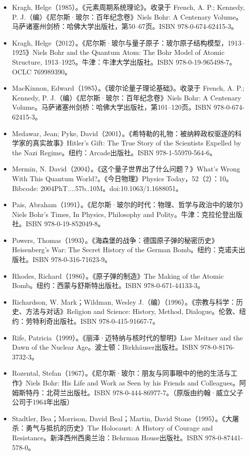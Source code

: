 \begin{itemize}
\item Kragh, Helge（1985）。《元素周期系统理论》。收录于 French, A. P.; Kennedy, P. J.（编）《尼尔斯·玻尔：百年纪念卷》Niels Bohr: A Centenary Volume。马萨诸塞州剑桥：哈佛大学出版社，第50–67页。ISBN 978-0-674-62415-3。
\item Kragh, Helge（2012）。《尼尔斯·玻尔与量子原子：玻尔原子结构模型，1913–1925》Niels Bohr and the Quantum Atom: The Bohr Model of Atomic Structure, 1913–1925。牛津：牛津大学出版社。ISBN 978-0-19-965498-7。OCLC 769989390。
\item MacKinnon, Edward（1985）。《玻尔论量子理论基础》。收录于 French, A. P.; Kennedy, P. J.（编）《尼尔斯·玻尔：百年纪念卷》Niels Bohr: A Centenary Volume。马萨诸塞州剑桥：哈佛大学出版社，第101–120页。ISBN 978-0-674-62415-3。
\item Medawar, Jean; Pyke, David（2001）。《希特勒的礼物：被纳粹政权驱逐的科学家的真实故事》Hitler's Gift: The True Story of the Scientists Expelled by the Nazi Regime。纽约：Arcade出版社。ISBN 978-1-55970-564-6。
\item Mermin, N. David（2004）。《这个量子世界出了什么问题？》What's Wrong With This Quantum World?。《今日物理》Physics Today，52（2）：10。Bibcode: 2004PhT....57b..10M。doi:10.1063/1.1688051。
\item Pais, Abraham（1991）。《尼尔斯·玻尔的时代：物理、哲学与政治中的玻尔》Niels Bohr's Times, In Physics, Philosophy and Polity。牛津：克拉伦登出版社。ISBN 978-0-19-852049-8。
\item Powers, Thomas（1993）。《海森堡的战争：德国原子弹的秘密历史》Heisenberg's War: The Secret History of the German Bomb。纽约：克诺夫出版社。ISBN 978-0-316-71623-9。
\item Rhodes, Richard（1986）。《原子弹的制造》The Making of the Atomic Bomb。纽约：西蒙与舒斯特出版社。ISBN 978-0-671-44133-3。
\item Richardson, W. Mark；Wildman, Wesley J.（编）（1996）。《宗教与科学：历史、方法与对话》Religion and Science: History, Method, Dialogue。伦敦、纽约：劳特利奇出版社。ISBN 978-0-415-91667-7。
\item Rife, Patricia（1999）。《丽泽·迈特纳与核时代的黎明》Lise Meitner and the Dawn of the Nuclear Age。波士顿：Birkhäuser出版社。ISBN 978-0-8176-3732-3。
\item Rozental, Stefan（1967）。《尼尔斯·玻尔：朋友与同事眼中的他的生活与工作》Niels Bohr: His Life and Work as Seen by his Friends and Colleagues。阿姆斯特丹：北荷兰出版社。ISBN 978-0-444-86977-7。（原版由约翰·威立父子公司于1964年出版）
\item Stadtler, Bea；Morrison, David Beal；Martin, David Stone（1995）。《大屠杀：勇气与抵抗的历史》The Holocaust: A History of Courage and Resistance。新泽西州西奥兰治：Behrman House出版社。ISBN 978-0-87441-578-0。

\end{itemize}
